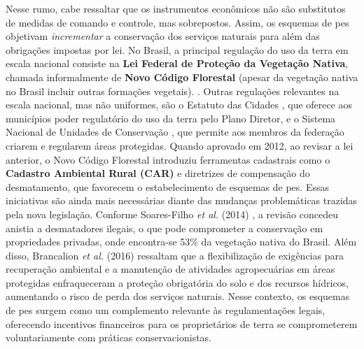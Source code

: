 \documentclass[./main.tex]{subfiles}
\begin{document}
\par Nesse rumo, cabe ressaltar que os instrumentos econômicos não são substitutos de medidas de comando e controle, mas sobrepostos. Assim, os esquemas de \acrshort{pes} objetivam \textit{incrementar} a conservação dos serviços naturais para além das obrigações impostas por lei. No Brasil, a principal regulação do uso da terra em escala nacional consiste na \textbf{Lei Federal de Proteção da Vegetação Nativa}, chamada informalmente de \textbf{Novo Código Florestal} (apesar da vegetação nativa no Brasil incluir outras formações vegetais). \cite{brasil12651}. Outras regulações relevantes na escala nacional, mas não uniformes, são o Estatuto das Cidades \cite{brasil2021}, que oferece aos municípios poder regulatório do uso da terra pelo Plano Diretor, e o Sistema Nacional de Unidades de Conservação \cite{Brasil2000}, que permite aos membros da federação criarem e regularem áreas protegidas. Quando aprovado em 2012, ao revisar a lei anterior, o Novo Código Florestal introduziu ferramentas cadastrais como o \textbf{Cadastro Ambiental Rural (CAR)} e diretrizes de compensação do desmatamento, que favorecem o estabelecimento de esquemas de \acrshort{pes}. Essas iniciativas são ainda mais necessárias diante das mudanças problemáticas trazidas pela nova legislação. Conforme Soares-Filho \textit{et al.} (2014) \cite{Soares-filho2014a}, a revisão concedeu anistia a desmatadores ilegais, o que pode comprometer a conservação em propriedades privadas, onde encontra-se 53\% da vegetação nativa do Brasil. Além disso, Brancalion \textit{et al.} (2016) \cite{Brancalion2016a} ressaltam que a flexibilização de exigências para recuperação ambiental e a manutenção de atividades agropecuárias em áreas protegidas enfraqueceram a proteção obrigatória do solo e dos recursos hídricos, aumentando o risco de perda dos serviços naturais. Nesse contexto, os esquemas de \acrshort{pes} surgem como um complemento relevante às regulamentações legais, oferecendo incentivos financeiros para os proprietários de terra se comprometerem voluntariamente com práticas conservacionistas. 
\end{document}
